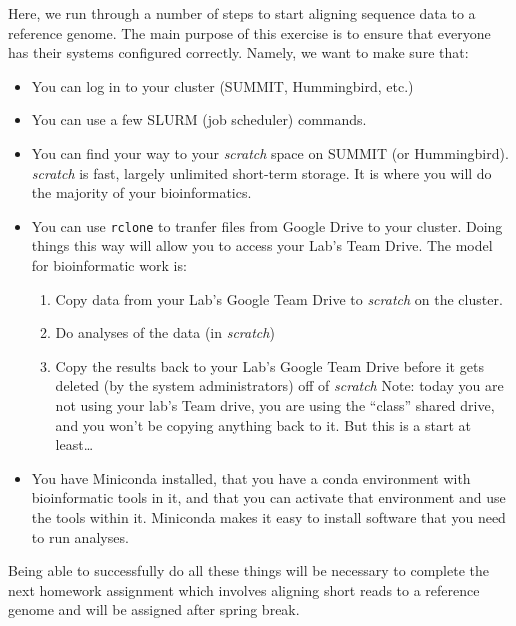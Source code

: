 \documentclass[]{krantz}
\providecommand{\tightlist}{%
  \setlength{\itemsep}{0pt}\setlength{\parskip}{0pt}}
\begin{document}
Here, we run through a number of steps to start aligning sequence data to a reference
genome. The main purpose of this exercise is to ensure that everyone has their systems
configured correctly. Namely, we want to make sure that:

\begin{itemize}
\tightlist
\item
  You can log in to your cluster (SUMMIT, Hummingbird, etc.)
\item
  You can use a few SLURM (job scheduler) commands.
\item
  You can find your way to your \emph{scratch} space on SUMMIT (or Hummingbird). \emph{scratch} is fast, largely
  unlimited short-term storage. It is where you will do the majority of your bioinformatics.
\item
  You can use \texttt{rclone} to tranfer files from Google Drive to your cluster. Doing things this way will allow
  you to access your Lab's Team Drive. The model for bioinformatic work is:

  \begin{enumerate}
  \def\labelenumi{\alph{enumi}.}
  \tightlist
  \item
    Copy data from your Lab's Google Team Drive to \emph{scratch} on the cluster.
  \item
    Do analyses of the data (in \emph{scratch})
  \item
    Copy the results back to your Lab's Google Team Drive before it gets deleted (by the system administrators)
    off of \emph{scratch}
    Note: today you are not using your lab's Team drive, you are using the ``class'' shared drive,
    and you won't be copying anything back to it. But this is a start at least\ldots{}
  \end{enumerate}
\item
  You have Miniconda installed, that you have a conda environment with bioinformatic
  tools in it, and that you can activate that environment and use the tools within it.
  Miniconda makes it easy to install software that you need to run analyses.
\end{itemize}

Being able to successfully do all these things will be necessary to complete
the next homework assignment which involves aligning short reads to a reference
genome and will be assigned after spring break.
\end{document}
